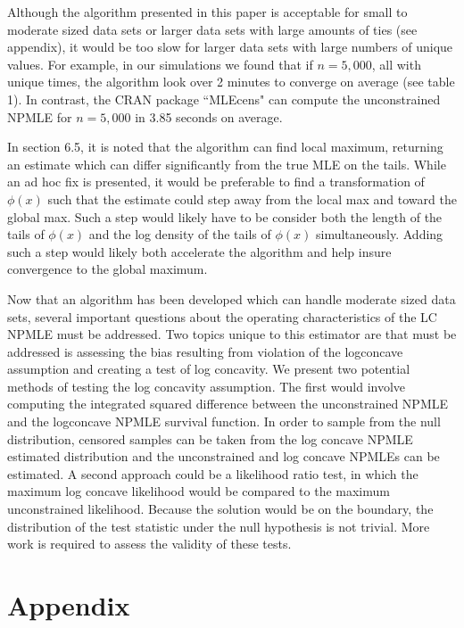 \documentclass[12pt]{article}
\numberwithin{equation}{section}
\begin{document}
	Although the algorithm presented in this paper is acceptable for small to moderate sized data sets or larger data sets with large amounts of ties (see appendix), it would be too slow for larger data sets with large numbers of unique values. For example, in our simulations we found that if $n = 5,000$, all with unique times, the algorithm look over 2 minutes to converge on average (see table 1). In contrast, the CRAN package ``MLEcens" can compute the unconstrained NPMLE for $ n = 5,000$ in 3.85 seconds on average. 
	
	In section 6.5, it is noted that the algorithm can find local maximum, returning an estimate which can differ significantly from the true MLE on the tails. While an ad hoc fix is presented, it would be preferable to find a transformation of $\phi(x)$ such that the estimate could step away from the local max and toward the global max. Such a step would likely have to be consider both the length of the tails of $\phi(x)$ and the log density of the tails of $\phi(x)$ simultaneously. Adding such a step would likely both accelerate the algorithm and help insure convergence to the global maximum.  
		
	Now that an algorithm has been developed which can handle moderate sized data sets, several important questions about the operating characteristics of the LC NPMLE must be addressed. Two topics unique to this estimator are that must be addressed is assessing the bias resulting from violation of the logconcave assumption and creating a test of log concavity. We present two potential methods of testing the log concavity assumption. The first would involve computing the integrated squared difference between the unconstrained NPMLE and the logconcave NPMLE survival function. In order to sample from the null distribution, censored samples can be taken from the log concave NPMLE estimated distribution and the unconstrained and log concave NPMLEs can be estimated. A second approach could be a likelihood ratio test, in which the maximum log concave likelihood would be compared to the maximum unconstrained likelihood. Because the solution would be on the boundary, the distribution of the test statistic under the null hypothesis is not trivial. More work is required to assess the validity of these tests.  


{\section{Appendix} } 
\end{document}
